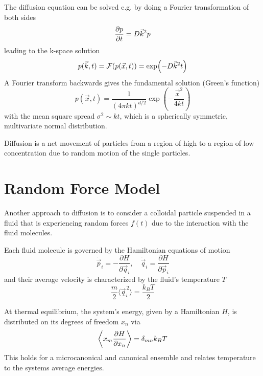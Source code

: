 \documentclass{notebook}
\begin{document}
The diffusion equation can be solved e.g. by doing a Fourier transformation of both sides
%
\begin{equation}
\pdv{p}{t} =  D \vec{k}^2 p
\end{equation}
%
leading to the k-space solution
%
\begin{equation}
p(\vec{k},t) = \mathcal{F}(p(\vec{x},t)) = \exp(-D \vec{k}^2 t)
\end{equation}
%
A Fourier transform backwards gives the fundamental solution (Green's function)
%
\begin{equation}
p(\vec{x},t) = \frac{1}{(4 \pi k t)^{d/2}} \exp(-\frac{\vec{x}^2}{4 k t})
\end{equation}
%
with the mean square spread $\sigma^2 \sim k t$, which is a spherically symmetric, multivariate normal distribution.

%
\begin{theorem}
	Diffusion is a net movement of particles from a region of high to a region of low concentration due to random motion of the single particles. 
\end{theorem}
%

\newpage
\section{Random Force Model}

Another approach to diffusion is to consider a colloidal particle suspended in a fluid that is experiencing random forces $f(t)$ due to the interaction with the fluid molecules. 

Each fluid molecule is governed by the Hamiltonian equations of motion
%
\begin{equation}
	\dot{\vec{p}}_i = -\frac{\partial H}{\partial \vec{q}_i}, \quad 
	\dot{\vec{q}}_i = \frac{\partial H}{\partial \vec{p}_i}
\end{equation}
%
and their average velocity is characterized by the fluid's temperature $T$
%
\begin{equation}
	\frac{m}{2} \langle \vec{q}_i^{\,2} \rangle = \frac{k_B T}{2}
\end{equation}
%

\begin{remark}
	At thermal equilibrium, the system's energy, given by a Hamiltonian $H$, is distributed on its degrees of freedom $x_n$ via
	\begin{equation}
		\expval{x_m \pdv{H}{x_n}} = \delta_{mn} k_B T
	\end{equation}
	This holds for a microcanonical and canonical ensemble and relates temperature to the systems average energies.
\end{remark}
\end{document}

